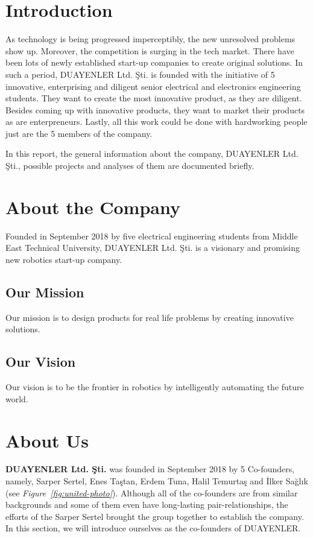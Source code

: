 \documentclass[a4paper,12pt]{article}
\newcommand{\blankpage}{
	\- \\[9cm]	
	{ \centering \textit{This page intentionally left blank.} \par }
	\- \\[9cm]
}%
\begin{document}
\tableofcontents
\newpage


\section{Introduction}
	As technology is being progressed imperceptibly, the new unresolved problems show up. Moreover, the competition is surging in the tech market. There have been lots of newly established start-up companies to create original solutions. In such a period, DUAYENLER Ltd. Şti. is founded with the initiative of 5 innovative, enterprising and diligent senior electrical and electronics engineering students. They want to create the most innovative product, as they are diligent. Besides coming up with innovative products, they want to market their products as are enterpreneurs. Lastly, all this work could be done with hardworking people just are the 5 members of the company.

In this report, the general information about the company, DUAYENLER Ltd. Şti., possible projects and analyses of them are documented briefly.
	
\section{About the Company}
Founded in September 2018 by five electrical engineering students from Middle East Technical University, DUAYENLER Ltd. Şti. is a visionary and promising new robotics start-up company.

\subsection{Our Mission}
	Our mission is to design products for real life problems by creating innovative solutions.
	
\subsection{Our Vision}
	Our vision is to be the frontier in robotics by intelligently automating the future world.

\section{About Us}
\textbf{DUAYENLER Ltd. Şti.} was founded in September 2018 by 5 Co-founders, namely, Sarper Sertel, Enes Taştan, Erdem Tuna, Halil Temurtaş and İlker Sağlık (see \textit{Figure~\ref{fig:united-photo}}).   Although all of the co-founders are from similar backgrounds and some of them even have long-lasting pair-relationships, the efforts of the Sarper Sertel brought  the group together to establish the company.  In this section, we will introduce ourselves as the co-founders of DUAYENLER.
\end{document}
